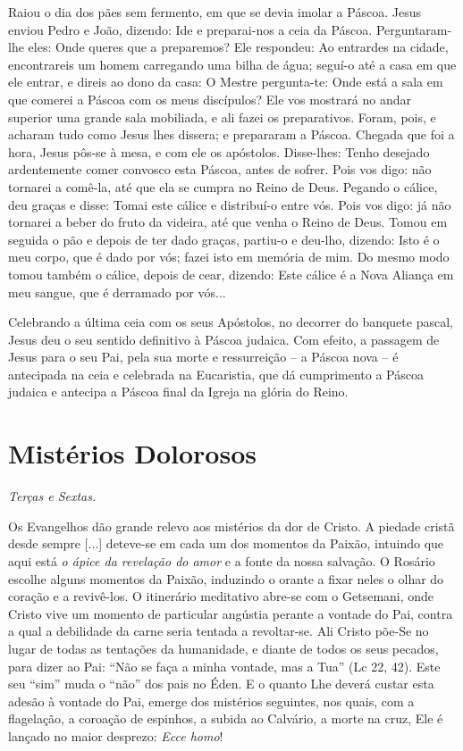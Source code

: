 \documentclass{rosario}
\begin{document}
Raiou o dia dos pães sem fermento, em que se devia imolar a Páscoa.
Jesus enviou Pedro e João, dizendo:
Ide e preparai-nos a ceia da Páscoa.
Perguntaram-lhe eles:
Onde queres que a preparemos?
Ele respondeu:
Ao entrardes na cidade, encontrareis um homem carregando uma bilha de água;
seguí-o até a casa em que ele entrar, e direis ao dono da casa:
O Mestre pergunta-te:
Onde está a sala em que comerei a Páscoa com os meus discípulos?
Ele vos mostrará no andar superior uma grande sala mobiliada, e ali fazei os preparativos.
Foram, pois, e acharam tudo como Jesus lhes dissera;
e prepararam a Páscoa.
Chegada que foi a hora, Jesus pôs-se à mesa, e com ele os apóstolos.
Disse-lhes:
Tenho desejado ardentemente comer convosco esta Páscoa, antes de sofrer.
Pois vos digo:
não tornarei a comê-la, até que ela se cumpra no Reino de Deus.
Pegando o cálice, deu graças e disse:
Tomai este cálice e distribuí-o entre vós.
Pois vos digo:
já não tornarei a beber do fruto da videira, até que venha o Reino de Deus.
Tomou em seguida o pão e depois de ter dado graças, partiu-o e deu-lho, dizendo:
Isto é o meu corpo, que é dado por vós;
fazei isto em memória de mim.
Do mesmo modo tomou também o cálice, depois de cear, dizendo:
Este cálice é a Nova Aliança em meu sangue, que é derramado por vós...



Celebrando a última ceia com os seus Apóstolos, no decorrer do banquete pascal, Jesus deu o seu sentido definitivo à Páscoa judaica.
Com efeito, a passagem de Jesus para o seu Pai, pela sua morte e ressurreição -- a Páscoa nova -- é antecipada na ceia e celebrada na Eucaristia, que dá cumprimento a Páscoa judaica e antecipa a Páscoa final da Igreja na glória do Reino.


\chapter{Mistérios Dolorosos}

\emph{Terças e Sextas.}


Os Evangelhos dão grande relevo aos mistérios da dor de Cristo.
A piedade cristã desde sempre [...] deteve-se em cada um dos momentos da Paixão, intuindo que aqui está \emph{o ápice da revelação do amor} e a fonte da nossa salvação.
O Rosário escolhe alguns momentos da Paixão, induzindo o orante a fixar neles o olhar do coração e a revivê-los.
O itinerário meditativo abre-se com o Getsemani, onde Cristo vive um momento de particular angústia perante a vontade do Pai, contra a qual a debilidade da carne seria tentada a revoltar-se.
Ali Cristo põe-Se no lugar de todas as tentações da humanidade, e diante de todos os seus pecados, para dizer ao Pai:
``Não se faça a minha vontade, mas a Tua'' (Lc 22, 42).
Este seu ``sim'' muda o ``não'' dos pais no Éden.
E o quanto Lhe deverá custar esta adesão à vontade do Pai, emerge dos mistérios seguintes, nos quais, com a flagelação, a coroação de espinhos, a subida ao Calvário, a morte na cruz, Ele é lançado no maior desprezo:
\emph{Ecce homo}!
\end{document}
